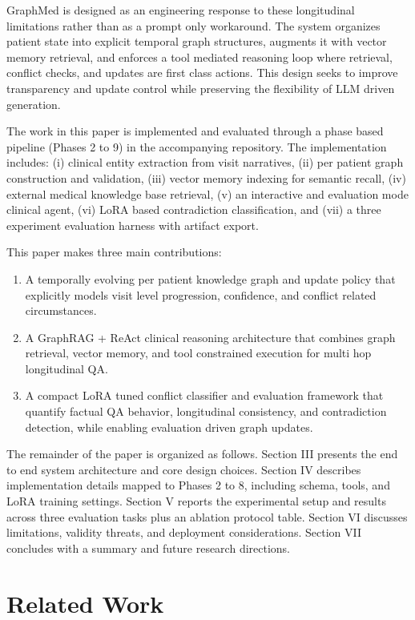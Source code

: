 \documentclass[conference]{IEEEtran}
\begin{document}
GraphMed is designed as an engineering response to these longitudinal limitations rather than as a prompt only workaround. The system organizes patient state into explicit temporal graph structures, augments it with vector memory retrieval, and enforces a tool mediated reasoning loop where retrieval, conflict checks, and updates are first class actions. This design seeks to improve transparency and update control while preserving the flexibility of LLM driven generation.

The work in this paper is implemented and evaluated through a phase based pipeline (Phases 2 to 9) in the accompanying repository. The implementation includes: (i) clinical entity extraction from visit narratives, (ii) per patient graph construction and validation, (iii) vector memory indexing for semantic recall, (iv) external medical knowledge base retrieval, (v) an interactive and evaluation mode clinical agent, (vi) LoRA based contradiction classification, and (vii) a three experiment evaluation harness with artifact export.

This paper makes three main contributions:
\begin{enumerate}
    \item A temporally evolving per patient knowledge graph and update policy that explicitly models visit level progression, confidence, and conflict related circumstances.
    \item A GraphRAG + ReAct clinical reasoning architecture that combines graph retrieval, vector memory, and tool constrained execution for multi hop longitudinal QA.
    \item A compact LoRA tuned conflict classifier and evaluation framework that quantify factual QA behavior, longitudinal consistency, and contradiction detection, while enabling evaluation driven graph updates.
\end{enumerate}

The remainder of the paper is organized as follows. Section III presents the end to end system architecture and core design choices. Section IV describes implementation details mapped to Phases 2 to 8, including schema, tools, and LoRA training settings. Section V reports the experimental setup and results across three evaluation tasks plus an ablation protocol table. Section VI discusses limitations, validity threats, and deployment considerations. Section VII concludes with a summary and future research directions.

\section{Related Work}
\end{document}
